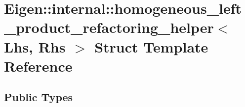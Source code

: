 \hypertarget{struct_eigen_1_1internal_1_1homogeneous__left__product__refactoring__helper}{}\section{Eigen\+:\+:internal\+:\+:homogeneous\+\_\+left\+\_\+product\+\_\+refactoring\+\_\+helper$<$ Lhs, Rhs $>$ Struct Template Reference}
\label{struct_eigen_1_1internal_1_1homogeneous__left__product__refactoring__helper}
\subsection*{Public Types}

